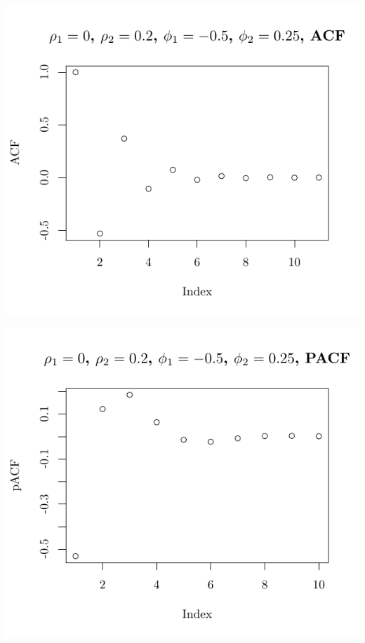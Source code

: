 \documentclass[10pt]{paper}\usepackage[]{graphicx}\usepackage[]{color}
\makeatletter
\def\maxwidth{ %
  \ifdim\Gin@nat@width>\linewidth
    \linewidth
  \else
    \Gin@nat@width
  \fi
}
\newenvironment{knitrout}{}{} %
\makeatother
\begin{document}
\begin{knitrout}
{\centering \includegraphics[width=\maxwidth]{figure/graphics-plotter-91} 

}




{\centering \includegraphics[width=\maxwidth]{figure/graphics-plotter-92} 

}





\end{knitrout}
\end{document}
